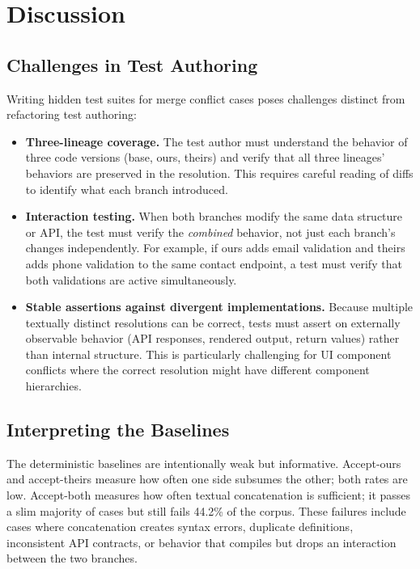 \documentclass[11pt,letterpaper]{article}
\begin{document}
\section{Discussion}
\label{sec:discussion}

\subsection{Challenges in Test Authoring}

Writing hidden test suites for merge conflict cases poses challenges distinct from refactoring test authoring:

\begin{itemize}[leftmargin=2em]
\item \textbf{Three-lineage coverage.} The test author must understand the behavior of three code versions (base, ours, theirs) and verify that all three lineages' behaviors are preserved in the resolution. This requires careful reading of diffs to identify what each branch introduced.

\item \textbf{Interaction testing.} When both branches modify the same data structure or API, the test must verify the \emph{combined} behavior, not just each branch's changes independently. For example, if ours adds email validation and theirs adds phone validation to the same contact endpoint, a test must verify that both validations are active simultaneously.

\item \textbf{Stable assertions against divergent implementations.} Because multiple textually distinct resolutions can be correct, tests must assert on externally observable behavior (API responses, rendered output, return values) rather than internal structure. This is particularly challenging for UI component conflicts where the correct resolution might have different component hierarchies.
\end{itemize}

\subsection{Interpreting the Baselines}

The deterministic baselines are intentionally weak but informative. Accept-ours and accept-theirs measure how often one side subsumes the other; both rates are low. Accept-both measures how often textual concatenation is sufficient; it passes a slim majority of cases but still fails 44.2\% of the corpus. These failures include cases where concatenation creates syntax errors, duplicate definitions, inconsistent API contracts, or behavior that compiles but drops an interaction between the two branches.
\end{document}
